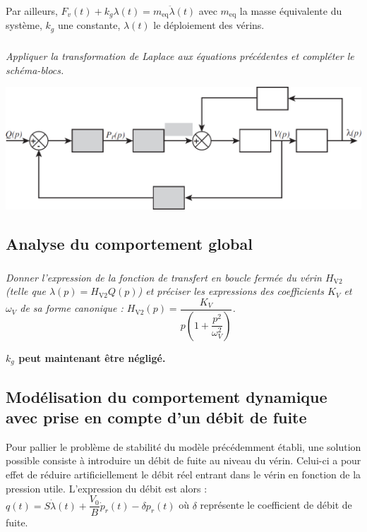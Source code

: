 \documentclass[10pt,fleqn]{article} %
\begin{document}
\begin{multicols}{2}
Par ailleurs, $F_v(t)+k_g \lambda(t)=m_{\text{eq}}\ddot{\lambda}(t)$ avec $m_{\text{eq}}$ la masse équivalente du système, $k_g$ une constante, $\lambda(t)$ le déploiement des vérins.


\subparagraph{}\textit{Appliquer la transformation de Laplace aux équations précédentes et compléter le schéma-blocs.}
\ifprof
\begin{corrige}
\end{corrige}
\else
\fi
\begin{center}
\includegraphics[width=\linewidth]{images/fig_06}
\end{center}


\subsection*{Analyse du comportement global}


\subparagraph{}\textit{Donner l'expression de la fonction de transfert en boucle fermée du vérin $H_{\text{V2}}$ (telle que $\lambda(p) =  H_{\text{V2}} Q(p)$) et préciser les expressions des coefficients $K_V$ et $\omega_V$ de sa forme canonique : $H_{\text{V2}}(p)=\dfrac{K_V}{p\left( 1+\dfrac{p^2}{\omega_V^2}\right)}$.}
\ifprof
\begin{corrige}
\end{corrige}
\else
\fi

\textbf{$k_g$ peut maintenant être négligé.}

\subsection*{Modélisation du comportement dynamique avec prise en compte d'un débit de fuite}
Pour pallier le problème de stabilité du modèle précédemment établi, une solution possible consiste à introduire un débit de fuite au niveau du vérin. Celui-ci a pour effet de réduire artificiellement le débit réel entrant dans le vérin en fonction de la pression utile. L'expression du débit est alors : 
$q(t)=S\dot{\lambda}(t)+\dfrac{V_0}{B} \dot{p}_r(t)-\delta p_r(t)$ où $\delta$ représente le coefficient de débit de fuite.



\end{multicols}
\end{document}
